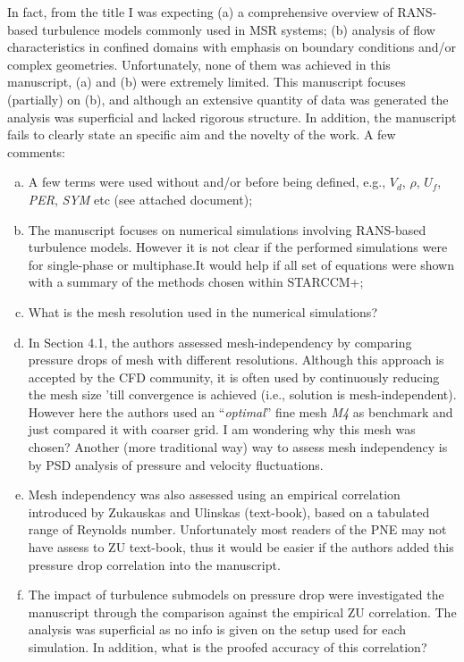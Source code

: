 \documentclass[14pt,twoside]{report}
\begin{document}
In fact, from the title I was expecting (a) a comprehensive overview of RANS-based turbulence models commonly used in MSR systems; (b) analysis of flow characteristics in confined domains with emphasis on boundary conditions and/or complex geometries. Unfortunately, none of them was achieved in this manuscript, (a) and (b) were extremely limited. This manuscript focuses (partially) on (b), and although an extensive quantity of data was generated the analysis was superficial and lacked rigorous structure. In addition, the manuscript fails to clearly state an specific aim and the novelty of the work. A few comments:
\begin{enumerate}[(a)] 
%
    \item A few terms were used without and/or before being defined, e.g., $V_{d}$, $\rho$, $U_{f}$, {\it PER}, {\it SYM} etc (see attached document);
    \item The manuscript focuses on numerical simulations involving RANS-based turbulence models. However it is not clear if the performed simulations were for single-phase or multiphase.It would help if all set of equations were shown with a summary of the methods chosen within STARCCM+;
    \item What is the mesh resolution used in the numerical simulations? 
    \item In Section 4.1, the authors assessed mesh-independency by comparing pressure drops of mesh with different resolutions. Although this approach is accepted by the CFD community, it is often used by continuously reducing the mesh size 'till convergence is achieved (i.e., solution is mesh-independent). However here the authors used an ``{\it optimal}'' fine mesh {\it M4} as benchmark and just compared it with coarser grid. I am wondering why this mesh was chosen? Another (more traditional way) way to assess mesh independency is by PSD analysis of pressure and velocity fluctuations. 
    \item Mesh independency was also assessed using an empirical correlation introduced by Zukauskas and Ulinskas (text-book), based on a tabulated range of Reynolds number. Unfortunately most readers of the PNE may not have assess to ZU text-book, thus it would be easier if the authors added this pressure drop correlation into the manuscript. 
    \item The impact of turbulence submodels on pressure drop were investigated the manuscript through the comparison against the empirical ZU correlation. The analysis was superficial as no info is given on the setup used for each simulation. In addition, what is the proofed accuracy of this correlation? 
\end{enumerate}
\end{document}
